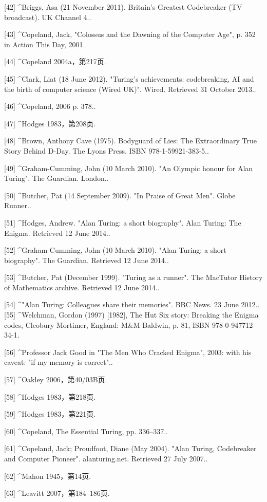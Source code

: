 [42]
^Briggs, Asa (21 November 2011). Britain's Greatest Codebreaker (TV broadcast). UK Channel 4..

[43]
^Copeland, Jack, "Colossus and the Dawning of the Computer Age", p. 352 in Action This Day, 2001..

[44]
^Copeland 2004a，第217页.

[45]
^Clark, Liat (18 June 2012). "Turing's achievements: codebreaking, AI and the birth of computer science (Wired UK)". Wired. Retrieved 31 October 2013..

[46]
^Copeland, 2006 p. 378..

[47]
^Hodges 1983，第208页.

[48]
^Brown, Anthony Cave (1975). Bodyguard of Lies: The Extraordinary True Story Behind D-Day. The Lyons Press. ISBN 978-1-59921-383-5..

[49]
^Graham-Cumming, John (10 March 2010). "An Olympic honour for Alan Turing". The Guardian. London..

[50]
^Butcher, Pat (14 September 2009). "In Praise of Great Men". Globe Runner..

[51]
^Hodges, Andrew. "Alan Turing: a short biography". Alan Turing: The Enigma. Retrieved 12 June 2014..

[52]
^Graham-Cumming, John (10 March 2010). "Alan Turing: a short biography". The Guardian. Retrieved 12 June 2014..

[53]
^Butcher, Pat (December 1999). "Turing as a runner". The MacTutor History of Mathematics archive. Retrieved 12 June 2014..

[54]
^"Alan Turing: Colleagues share their memories". BBC News. 23 June 2012..
[55]
^Welchman, Gordon (1997) [1982], The Hut Six story: Breaking the Enigma codes, Cleobury Mortimer, England: M&M Baldwin, p. 81, ISBN 978-0-947712-34-1.

[56]
^Professor Jack Good in "The Men Who Cracked Enigma", 2003: with his caveat: "if my memory is correct"..

[57]
^Oakley 2006，第40/03B页.

[58]
^Hodges 1983，第218页.

[59]
^Hodges 1983，第221页.

[60]
^Copeland, The Essential Turing, pp. 336–337..

[61]
^Copeland, Jack; Proudfoot, Diane (May 2004). "Alan Turing, Codebreaker and Computer Pioneer". alanturing.net. Retrieved 27 July 2007..

[62]
^Mahon 1945，第14页.

[63]
^Leavitt 2007，第184–186页.

